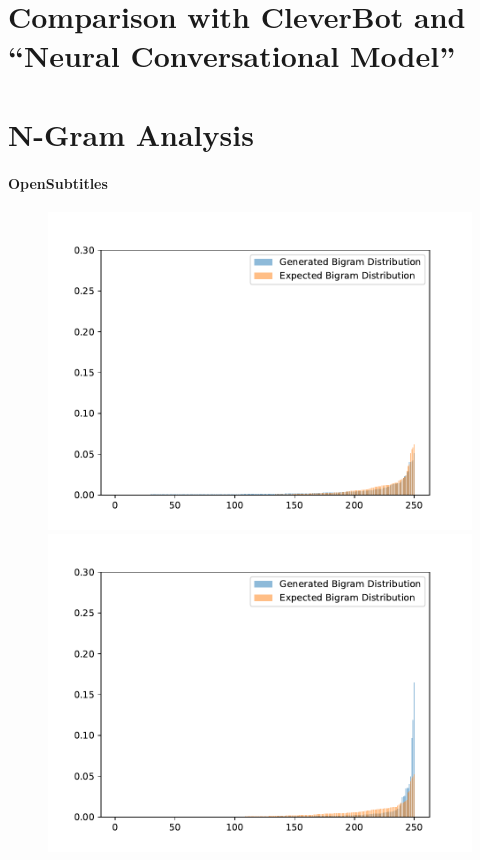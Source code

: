 \section{Comparison with CleverBot and ``Neural Conversational Model''}
\blindtext

\section{N-Gram Analysis}

\paragraph{OpenSubtitles} \blindtext
\begin{figure}[H]
	\includegraphics[width=\linewidth]{img/plots/opensubtitles_not_reversed/bigram_distribution_comparison_step_500000.pdf}
	\centering
	\small
	\endminipage\hfill
	\includegraphics[width=\linewidth]{img/plots/opensubtitles_not_reversed/bigram_distribution_comparison_step_1000000.pdf}

\end{figure}
